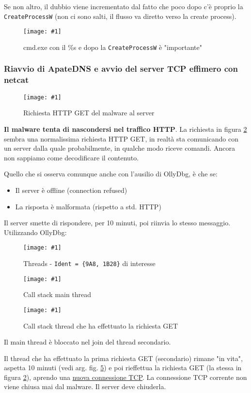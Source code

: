 \documentclass[
    a4paper, %
    11pt %
]{article}
\newcommand{\pic}[4]{\begin{figure}[H]
            \centering
            \texttt{[image: \#1]}
            \caption{#2}
            \label{fig:#1}
            \end{figure}}
\begin{document}
            Se non altro, il dubbio viene incrementato dal fatto che poco dopo c'è proprio la \texttt{CreateProcessW} (non ci sono salti, il flusso va diretto verso la create process).

            \pic{wellwellwell}{cmd.exe con il \%s e dopo la \texttt{CreateProcessW} è "importante"}{12cm}{6cm}
            
            \subsubsection{Riavvio di ApateDNS e avvio del server TCP effimero con netcat}

            \pic{httpget}{Richiesta HTTP GET del malware al server}{19cm}{4cm}

            \textbf{Il malware tenta di nascondersi nel traffico HTTP}. La richiesta in figura \ref{fig:httpget}
            sembra una normalissima richiesta HTTP GET, in realtà sta comunicando con un server dalla quale
            probabilmente, in qualche modo riceve comandi. Ancora non sappiamo come decodificare il contenuto.

            Quello che si osserva comunque anche con l'ausilio di OllyDbg, è che se:
            \begin{itemize}
                \item Il server è offline (connection refused)
                \item La risposta è malformata (rispetto a std. HTTP)
            \end{itemize}

            Il server smette di rispondere, per 10 minuti, poi riinvia lo stesso messaggio.
            Utilizzando OllyDbg:

            \pic{noans_thrs}{Threads - \texttt{Ident = \{9A8, 1B28\}} di interesse}{19cm}{5cm}

            \pic{noans_mainthr_callstack}{Call stack main thread}{16cm}{6cm}

            \pic{noans_callstack}{Call stack thread che ha effettuato la richiesta GET}{16cm}{6cm}

            Il main thread è bloccato nel join del thread secondario.

            Il thread che ha effettuato la prima richiesta GET (secondario) rimane "in vita", aspetta 10 minuti (vedi arg.
            fig. \ref{fig:noans_callstack}) e poi rieffettua la richiesta GET (la stessa in figura \ref{fig:httpget}), aprendo una \underline{nuova connessione
            TCP}. La connessione TCP corrente non viene chiusa mai dal malware. Il server deve chiuderla.
\end{document}
